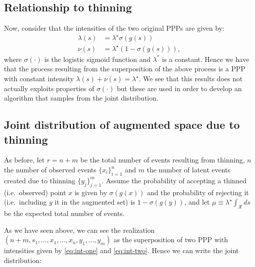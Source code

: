 \documentclass{article}
\newcommand{\calR}{\mathcal{R}}
\newcommand{\sigmoid}{\sigma}
\begin{document}
	 \subsection{Relationship to thinning}
	 Now, consider that the intensities of the two original \glspl{PPP} are given by:
	 \begin{align}
	 	\label{eq:int-one}
	 	\lambda(s) &= \lambda^{\star}  \sigmoid(g(s)) \\
	 	\label{eq:int-two}
	 	\nu(s) & = \lambda^{\star} (1-\sigmoid(g(s))) \text{,}	 
	 \end{align}
	 where $\sigmoid(\cdot)$ is the logistic sigmoid function and $\lambda^{*}$ is a constant. Hence we have that the process resulting from the superposition of the above process is a \gls{PPP} with constant intensity $\lambda(s) + \nu(s) = \lambda^{\star}$. We see that this results does not actually exploits properties of $\sigmoid(\cdot)$ but these are used in order to develop an algorithm that samples from the joint distribution. 
	 
	 
	 \subsection{Joint distribution of augmented space due to thinning}
	 As before, let $r = n + m$ be  the total number of events resulting from thinning, $n$ the number of observed events $\{x_i\}_{i=1}^n$ and $m$ the number of latent events  created due to thinning $\{ y_j \}_{j=1}^{m}$. 
	  Assume the probability of accepting a thinned (i.e.~observed) point $x$ is given by $\sigmoid(g(x))$ and the probability of rejecting it (i.e.~including $y$ it in the augmented set) is $1 - \sigmoid(g(y))$, and let $\mu \equiv \lambda^{\star} \int_{\calR} ds$ be the expected total number of events. 
	 
	 As we have seen above, we can see the realization $(n+m, s_1, \ldots, x_1, \ldots, x_n, y_1, \ldots, y_m )$ as the superposition of two \gls{PPP} with intensities given by  \cref{eq:int-one} and \cref{eq:int-two}. Hence we can write the joint distribution:
	 
\end{document}
